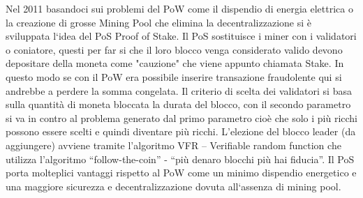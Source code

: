 \documentclass[12pt]{report}
\begin{document}
Nel 2011 basandoci sui problemi del PoW come il dispendio di energia elettrica o la creazione di grosse Mining Pool che elimina la decentralizzazione si è sviluppata l`idea del PoS Proof of Stake. Il PoS sostituisce i miner con i validatori o coniatore, questi per far si che il loro blocco venga considerato valido devono depositare della moneta come "cauzione" che viene appunto chiamata Stake. 
In questo modo se con il PoW era possibile inserire transazione fraudolente qui si andrebbe a perdere la somma congelata. Il criterio di scelta dei validatori si basa sulla quantità di moneta bloccata la durata del blocco, con il secondo parametro si va in contro al problema generato dal primo parametro cioè che solo i più ricchi possono essere scelti e quindi diventare più ricchi.
L’elezione del blocco leader (da aggiungere) avviene tramite l’algoritmo VFR – Verifiable random function che utilizza l’algoritmo “follow-the-coin” - “più denaro blocchi più hai fiducia”. Il PoS porta molteplici vantaggi rispetto al PoW come un minimo dispendio energetico e una maggiore sicurezza e decentralizzazione dovuta all`assenza di mining pool.
\end{document}
